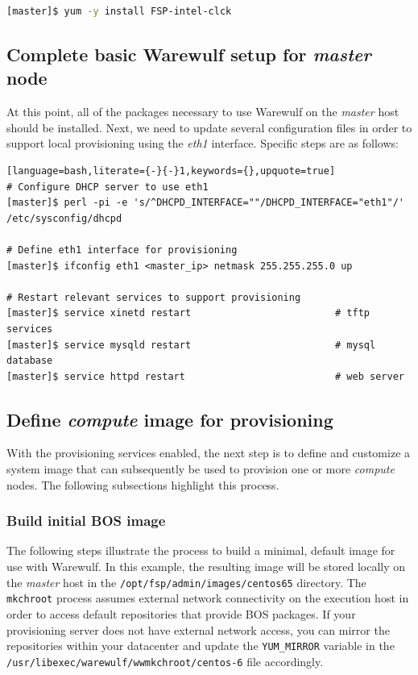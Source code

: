 \documentclass[letterpaper]{article}
\begin{document}
\begin{lstlisting}[language=bash,keywords={}]
[master]$ yum -y install FSP-intel-clck
\end{lstlisting}


\subsection{Complete basic Warewulf setup for {\em master} node}

At this point, all of the packages necessary to use Warewulf on the {\em
  master} host should be installed.  Next, we need to update several
configuration files in order to support local provisioning using the {\em eth1}
interface.  Specific steps are as follows:


\begin{lstlisting}[language=bash,literate={-}{-}1,keywords={},upquote=true]
# Configure DHCP server to use eth1
[master]$ perl -pi -e 's/^DHCPD_INTERFACE=""/DHCPD_INTERFACE="eth1"/' /etc/sysconfig/dhcpd

# Define eth1 interface for provisioning
[master]$ ifconfig eth1 <master_ip> netmask 255.255.255.0 up

# Restart relevant services to support provisioning
[master]$ service xinetd restart                         # tftp services
[master]$ service mysqld restart                         # mysql database
[master]$ service httpd restart                          # web server
\end{lstlisting}

\subsection{Define {\em compute} image for provisioning}

With the provisioning services enabled, the next step is to define and
customize a system image that can subsequently be used to provision one or more
{\em compute} nodes. The following subsections highlight this process.

\subsubsection{Build initial BOS image}

The following steps illustrate the process to build a minimal, default
image for use with Warewulf. In this example, the resulting image will be
stored locally on the {\em master} host in the
\texttt{/opt/fsp/admin/images/centos65} directory. The
\texttt{mkchroot} process assumes external network connectivity on the
execution host in order to access default repositories that provide BOS
packages. If your provisioning server does not have external network access,
you can mirror the repositories within your datacenter and update the
\texttt{YUM\_MIRROR} variable in the
\texttt{/usr/libexec/warewulf/wwmkchroot/centos-6} file accordingly.  
\end{document}

